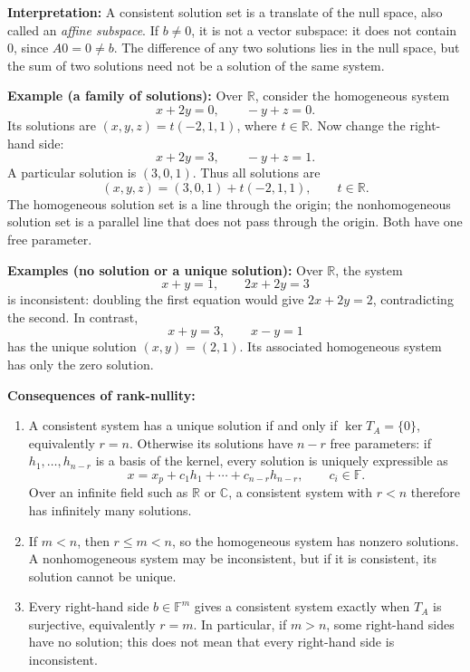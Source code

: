 \documentclass[a4paper,11pt,abstract=true]{scrartcl}
\theoremstyle{dotlessP}
\theoremstyle{dotlessS}
\theoremstyle{remark}
\theoremstyle{definition}
\begin{document}
\begin{claim_box}
\textbf{Interpretation:} A consistent solution set is a translate
of the null space, also called an \emph{affine subspace}. If $b\neq0$,
it is not a vector subspace: it does not contain $0$, since $A0=0\neq b$.
The difference of any two solutions lies in the null space, but the sum
of two solutions need not be a solution of the same system.
\end{claim_box}

\begin{example_box}
\textbf{Example (a family of solutions):} Over $\mathbb{R}$,
consider the homogeneous system
\[
x+2y=0,\qquad -y+z=0.
\]
Its solutions are $(x,y,z)=t(-2,1,1)$, where $t\in\mathbb{R}$.
Now change the right-hand side:
\[
x+2y=3,\qquad -y+z=1.
\]
A particular solution is $(3,0,1)$. Thus all solutions are
\[
(x,y,z)=(3,0,1)+t(-2,1,1),\qquad t\in\mathbb{R}.
\]
The homogeneous solution set is a line through the origin; the
nonhomogeneous solution set is a parallel line that does not pass
through the origin. Both have one free parameter.
\end{example_box}

\begin{example_box}
\textbf{Examples (no solution or a unique solution):} Over
$\mathbb{R}$, the system
\[
x+y=1,\qquad 2x+2y=3
\]
is inconsistent: doubling the first equation would give $2x+2y=2$,
contradicting the second. In contrast,
\[
x+y=3,\qquad x-y=1
\]
has the unique solution $(x,y)=(2,1)$. Its associated homogeneous system
has only the zero solution.
\end{example_box}

\begin{claim_box}
\textbf{Consequences of rank-nullity:}
\begin{enumerate}
    \item A consistent system has a unique solution if and only if
    $\ker T_A=\{0\}$, equivalently $r=n$. Otherwise its solutions have
    $n-r$ free parameters: if $h_1,\ldots,h_{n-r}$ is a basis of the
    kernel, every solution is uniquely expressible as
    \[
    x=x_p+c_1 h_1+\cdots+c_{n-r}h_{n-r},\qquad c_i\in\mathbb{F}.
    \]
    Over an infinite field such as $\mathbb{R}$ or $\mathbb{C}$, a
    consistent system with $r<n$ therefore has infinitely many solutions.
    \item If $m<n$, then $r\leq m<n$, so the homogeneous system has
    nonzero solutions. A nonhomogeneous system may be inconsistent,
    but if it is consistent, its solution cannot be unique.
    \item Every right-hand side $b\in\mathbb{F}^m$ gives a consistent
    system exactly when $T_A$ is surjective, equivalently $r=m$.
    In particular, if $m>n$, some right-hand sides have no solution;
    this does not mean that every right-hand side is inconsistent.
\end{enumerate}
\end{claim_box}
\end{document}
